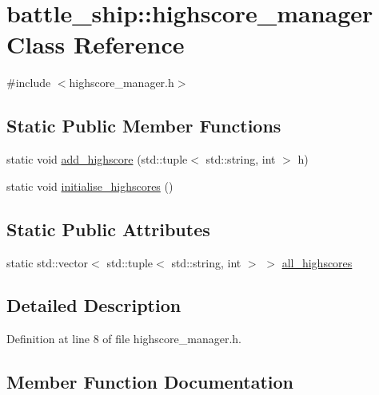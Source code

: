 \hypertarget{classbattle__ship_1_1highscore__manager}{}\section{battle\+\_\+ship\+:\+:highscore\+\_\+manager Class Reference}
\label{classbattle__ship_1_1highscore__manager}


{\ttfamily \#include $<$highscore\+\_\+manager.\+h$>$}

\subsection*{Static Public Member Functions}
\begin{DoxyCompactItemize}
\item 
static void \hyperlink{classbattle__ship_1_1highscore__manager_a7fcb9a8ba8457ee9d66349d3f4c51fee}{add\+\_\+highscore} (std\+::tuple$<$ std\+::string, int $>$ h)
\item 
static void \hyperlink{classbattle__ship_1_1highscore__manager_a404a994ea85111522a7a4f571bcbacdc}{initialise\+\_\+highscores} ()
\end{DoxyCompactItemize}
\subsection*{Static Public Attributes}
\begin{DoxyCompactItemize}
\item 
static std\+::vector$<$ std\+::tuple$<$ std\+::string, int $>$ $>$ \hyperlink{classbattle__ship_1_1highscore__manager_a53bb0aa2445ba4caa4cfe7c4b0fef663}{all\+\_\+highscores}
\end{DoxyCompactItemize}


\subsection{Detailed Description}


Definition at line 8 of file highscore\+\_\+manager.\+h.



\subsection{Member Function Documentation}
\mbox{\label{classbattle__ship_1_1highscore__manager_a7fcb9a8ba8457ee9d66349d3f4c51fee}} 

